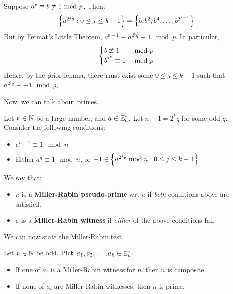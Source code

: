 \documentclass{article}
\begin{document}
\begin{pf}[source=Primary Source Material]
    Suppose $ a^{q} \equiv b \cnot\equiv 1 \mod p $. Then:
    \begin{equation*}
        \left\{{a^{2^{j}q} : 0 \leq j \leq k - 1}\right\} = \left\{{b, b^{2}, b^{4}, \dots, b^{2^{k - 1}}}\right\}
    \end{equation*}
    But by Fermat's Little Theorem, $ a^{p-1} \equiv a^{2^{k}q} \equiv 1 \mod p $.
    In particular,
    \begin{equation*}
        \begin{cases} b \cnot\equiv 1 & \mod p \\ b^{2^{k}} \equiv 1 & \mod p \end{cases}
    \end{equation*}
    Hence, by the prior lemma, there must exist some $ 0 \leq j \leq k - 1 $ such that
    $ a^{2^{j}q} \equiv -1 \mod p $.
\end{pf}

Now, we can talk about primes.

\newpage
\begin{defn}
    Let $ n \in \mathbb{N} $ be a large number, and $ a \in \mathbb{Z}_{n}^{*} $.
    Let $ n - 1 = 2^{k}q $ for some odd $ q $. Consider the following conditions:
    \begin{itemize}
        \item $ a^{n-1} \equiv 1 \mod n $
        \item Either $ a^{q} \equiv 1 \mod n $, or $ -1 \in \left\{{a^{2^{j}q} \ \mathrm{mod}\ n :
            0 \leq j \leq k - 1}\right\} $
    \end{itemize}
    We say that:
    \begin{itemize}
        \item $ n $ is a \textbf{Miller-Rabin pseudo-prime} wrt $ a $ if \textit{both} conditions
            above are satisfied.
        \item $ a $ is a \textbf{Miller-Rabin witness} if \textit{either} of the above
            conditions fail.
    \end{itemize}
\end{defn}

We can now state the Miller-Rabin test.

\begin{thm}
    Let $ n \in \mathbb{N} $ be odd. Pick $ a_{1}, a_{2}, \dots, a_{k} \in \mathbb{Z}_{n}^{*} $.
    \begin{itemize}
        \item If one of $ a_{i} $ is a Miller-Rabin witness for $ n $, then $ n $ is composite.
        \item If none of $ a_{i} $ are Miller-Rabin witnesses, then $ n $ is prime.
    \end{itemize}
\end{thm}
\end{document}
